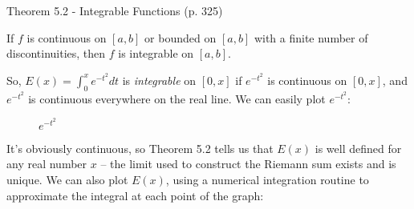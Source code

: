 \begin{framed}
\cite{briggs} Theorem 5.2 - Integrable Functions (p. 325)

If $f$ is continuous on $[a,b]$ or bounded on $[a,b]$ with a finite number of discontinuities,
then $f$ is integrable on $[a,b]$.
\end{framed}

So, $E(x) = \int_0^x e^{-t^2} dt$ is {\it integrable} on $[0,x]$ if $e^{-t^2}$ is continuous on $[0,x]$,
and $e^{-t^2}$ is continuous everywhere on the real line.  We can easily plot $e^{-t^2}$:

\begin{comment}
\begin{maximacode}
/* This code autogenerates filenames for pdf graphics so they */
/* can be easily embedded into LaTeX. */

pdf_graphics_fileno: 0$

next_pdf_filename() := (
   pdf_graphics_fileno : pdf_graphics_fileno + 1,
   concat("./GRAPH-", pdf_graphics_fileno, ".pdf")
)$

embed_latex_graphic(filename) :=
   ?princ(concat("\\optionalgraphics[width=0.7\\textwidth]{", filename, "}"))$

pdfplot2d([args]) := block(
   [filename: next_pdf_filename()],
   apply(plot2d, endcons([pdf_file, filename], args)),
   embed_latex_graphic(filename)
)$

pdfplot3d([args]) := block(
   [filename: next_pdf_filename()],
   apply(plot3d, endcons([pdf_file, filename], args)),
   embed_latex_graphic(filename)
)$
\end{maximacode}
\end{comment}

\begin{figure}[H]
\begin{center}
\begin{comment}
\begin{maximacode}
pdfplot2d (exp(-x^2),
           [x, -6, 6], [ylabel, false], [grid2d, true], [legend, false],
           [color, red])$
\end{maximacode}
\end{comment}
\end{center}
\caption{$e^{-t^2}$}
\end{figure}

It's obviously continuous, so Theorem 5.2 tells us that $E(x)$ is well
defined for any real number $x$ -- the limit used to construct the
Riemann sum exists and is unique.  We can also plot $E(x)$, using a
numerical integration routine to approximate the integral at each
point of the graph:

